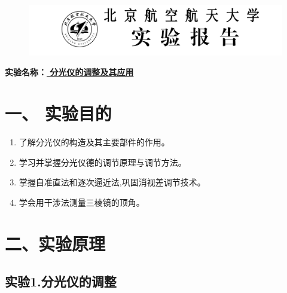 \documentclass[11pt,a4paper,oneside]{article}
\begin{document}
\begin{figure}[H]
 \centering
  \includegraphics[width=13cm]{Image/表头.png}
\end{figure}
\begin{center}
\textbf{{\large 实验名称：\uline{          分光仪的调整及其应用       }}}
\end{center}
\section*{一、 实验目的}
\begin{enumerate}
\item 了解分光仪的构造及其主要部件的作用。
\item 学习并掌握分光仪德的调节原理与调节方法。
\item 掌握自准直法和逐次逼近法,巩固消视差调节技术。
\item 学会用干涉法测量三棱镜的顶角。
\end{enumerate}

\section*{二、实验原理}
\subsection*{实验1.分光仪的调整}
\end{document}

